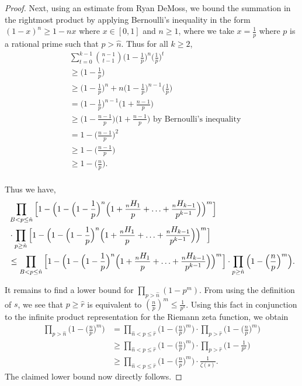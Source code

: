 \documentclass[10pt,a4paper]{article}
\begin{document}
\begin{proof}
			Next, using an estimate from Ryan DeMoss, we bound the summation in the rightmost product by applying Bernoulli's inequality in the form $(1 - x)^n \geq 1 - nx$ where $x \in [0, 1]$ and $n \geq 1$, where we take $x = \frac{1}{p}$ where $p$ is a rational prime such that $p > \hat{n}$. Thus for all $k\geq2$,
			\begin{align*}
				&\sum_{t=0}^{k-1}\binom{n-1}{t-1}\Big(1-\frac{1}{p}\Big)^n\Big(\frac{1}{p}\Big)^t\\
				 &\geq \Big(1-\frac{1}{p}\Big)\\
				&\geq\Big(1-\frac{1}{p}\Big)^n+n\Big(1-\frac{1}{p}\Big)^{n-1}\Big(\frac{1}{p}\Big)\\
				&=\Big(1-\frac{1}{p}\Big)^{n-1}\Big(1+\frac{n-1}{p}\Big)\\
				&\geq\Big(1-\frac{n-1}{p}\Big)\Big(1+\frac{n-1}{p}\Big) \text{ by Bernoulli's inequality}\\
				&=1-\Big(\frac{n-1}{p}\Big)^2\\
				&\geq 1-\Big(\frac{n-1}{p}\Big)\\
				&\geq 1-\Big(\frac{n}{p}\Big).\\
			\end{align*}
			
			Thus we have,
			\begin{align*}
				&\prod_{B<p\leq\hat{n}} \Big[1 - \Big(1 -\Big(1-\frac{1}{p}\Big)^n\Big(1+\frac{{}_nH_1}{p}+\mathellipsis+\frac{{}_nH_{k-1}}{p^{k-1}}\Big)\Big)^m\Big]\\
				&\cdot\prod_{p\geq\hat{n}} \Big[1 - \Big(1 -\Big(1-\frac{1}{p}\Big)^n\Big(1+\frac{{}_nH_1}{p}+\mathellipsis+\frac{{}_nH_{k-1}}{p^{k-1}}\Big)\Big)^m\Big]\\
				&\leq\prod_{B<p\leq\hat{n}} \Big[1 - \Big(1 -\Big(1-\frac{1}{p}\Big)^n\Big(1+\frac{{}_nH_1}{p}+\mathellipsis+\frac{{}_nH_{k-1}}{p^{k-1}}\Big)\Big)^m\Big]\cdot \prod_{p\geq\hat{n}} \Big(1 - \Big(\frac{n}{p}\Big)^m\Big).\\
			\end{align*}
			
			\vspace{.1 in}
			
			It remains to find a lower bound for $\prod_{p>\hat{n}} (1 - p^m)$. From using the definition of $s$, we see that $p \geq \hat{r}$ is equivalent to $(\frac{n}{p})^m \leq \frac{1}{p^s}$. Using this fact in conjunction to the infinite product representation for the Riemann zeta function, we obtain 
			\begin{align*} \prod_{p>\hat{n}}\Big(1 - \Big(\frac{n}{p}\Big)^m\Big) &= \prod_{\hat{n}< p \leq \hat{r}}\Big(1 - \Big(\frac{n}{p}\Big)^m\Big) \cdot \prod_{p>\hat{r}}\Big(1 - \Big(\frac{n}{p}\Big)^m\Big)\\ &\geq  \prod_{\hat{n}< p \leq \hat{r}}\Big(1 - \Big(\frac{n}{p}\Big)^m\Big) \cdot \prod_{p>\hat{r}}\Big(1 - \frac{1}{p^s}\Big)\\ &\geq  \prod_{\hat{n}< p \leq \hat{r}}\Big(1 - \Big(\frac{n}{p}\Big)^m\Big) \cdot \frac{1}{\zeta(s)}. \end{align*}
			The claimed lower bound now directly follows. 
			

\end{proof}
\end{document}
